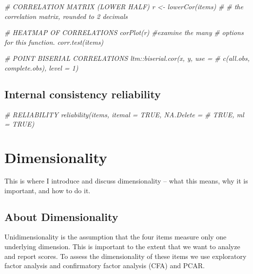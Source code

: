 \documentclass[
]{report}
\newenvironment{Shaded}{\begin{snugshade}}{\end{snugshade}}
\newcommand{\CommentTok}[1]{\textcolor[rgb]{0.56,0.35,0.01}{\textit{#1}}}
\begin{document}
\begin{Shaded}
\begin{Highlighting}[]
\CommentTok{\# CORRELATION MATRIX (LOWER HALF) r \textless{}{-} lowerCor(items) \#}
\CommentTok{\# the correlation matrix, rounded to 2 decimals}

\CommentTok{\# HEATMAP OF CORRELATIONS corPlot(r) \#examine the many}
\CommentTok{\# options for this function.  corr.test(items)}

\CommentTok{\# POINT BISERIAL CORRELATIONS ltm::biserial.cor(x, y, use =}
\CommentTok{\# c(\textquotesingle{}all.obs\textquotesingle{}, \textquotesingle{}complete.obs\textquotesingle{}), level = 1)}
\end{Highlighting}
\end{Shaded}

\hypertarget{internal-consistency-reliability}{%
\section{Internal consistency reliability}\label{internal-consistency-reliability}}

\begin{Shaded}
\begin{Highlighting}[]
\CommentTok{\# RELIABILITY reliability(items, itemal = TRUE, NA.Delete =}
\CommentTok{\# TRUE, ml = TRUE)}
\end{Highlighting}
\end{Shaded}

\hypertarget{dimensionality}{%
\chapter{Dimensionality}\label{dimensionality}}

This is where I introduce and discuss dimensionality -- what this means, why it is important, and how to do it.

\hypertarget{about-dimensionality}{%
\section{About Dimensionality}\label{about-dimensionality}}

Unidimensionality is the assumption that the four items measure only one underlying dimension. This is important to the extent that we want to analyze and report scores. To assess the dimensionality of these items we use exploratory factor analysis and confirmatory factor analysis (CFA) and PCAR.
\end{document}
